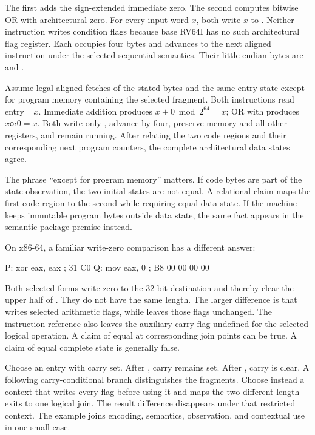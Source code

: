 The first adds the sign-extended immediate zero. The second computes bitwise
OR with architectural zero. For every input word \(x\), both write \(x\) to
. Neither instruction writes condition flags because base RV64I has no
such architectural flag register. Each occupies four bytes and advances to
the next aligned instruction under the selected sequential semantics. Their
little-endian bytes are  and .

\begin{proofkit}[title={RV64I full-state agreement for the selected pair}]
Assume legal aligned fetches of the stated bytes and the same entry state
except for program memory containing the selected fragment. Both instructions
read entry =\(x\). Immediate addition produces
\(x+0\bmod 2^{64}=x\); OR with  produces
\(x\mathbin{\mathsf{or}}0=x\). Both write only , advance by four,
preserve memory and all other registers, and remain
running. After relating the two code regions and their corresponding next
program counters, the complete architectural data states agree.
\end{proofkit}

The phrase ``except for program memory'' matters. If code bytes are part of
the state observation, the two initial states are not equal. A relational
claim maps the first code region to the second while requiring equal data
state. If the machine keeps immutable program bytes outside data state, the
same fact appears in the semantic-package premise instead.

On x86-64, a familiar write-zero comparison has a different answer:

\begin{codelisting}[language={},caption={Two x86-64 ways to write zero to RAX}]
P: xor eax, eax       ; 31 C0
Q: mov eax, 0         ; B8 00 00 00 00
\end{codelisting}

Both selected forms write zero to the 32-bit destination and thereby clear the
upper half of . They do not have the same length. The larger difference is that
 writes selected arithmetic flags, while  leaves those
flags unchanged. The instruction reference also leaves the auxiliary-carry
flag undefined for the selected logical operation. A claim of equal 
at corresponding join points can be true. A claim of equal complete state is
generally false.

Choose an entry with carry set. After , carry remains set. After
, carry is clear. A following carry-conditional branch distinguishes
the fragments. Choose instead a context that writes every flag before
using it and maps the two different-length exits to one logical join. The
result difference disappears under that restricted context. The example joins
encoding, semantics, observation, and contextual use in one small case.

